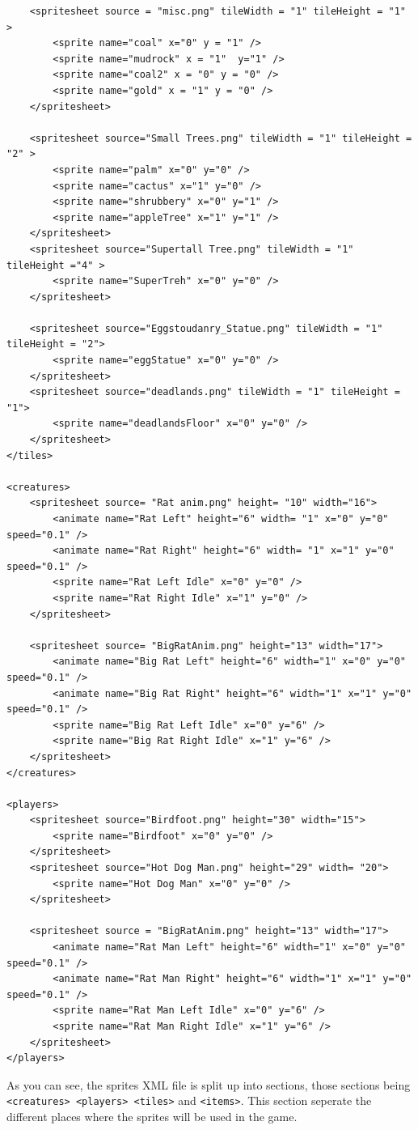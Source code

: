 \documentclass{book}
\begin{document}
\begin{verbatim}
	<spritesheet source = "misc.png" tileWidth = "1" tileHeight = "1" >
		<sprite name="coal" x="0" y = "1" />
		<sprite name="mudrock" x = "1"  y="1" />
		<sprite name="coal2" x = "0" y = "0" />
		<sprite name="gold" x = "1" y = "0" />
	</spritesheet>

	<spritesheet source="Small Trees.png" tileWidth = "1" tileHeight = "2" >
		<sprite name="palm" x="0" y="0" />
		<sprite name="cactus" x="1" y="0" />
		<sprite name="shrubbery" x="0" y="1" />
		<sprite name="appleTree" x="1" y="1" />
	</spritesheet>
	<spritesheet source="Supertall Tree.png" tileWidth = "1" tileHeight ="4" >
		<sprite name="SuperTreh" x="0" y="0" />
	</spritesheet>

	<spritesheet source="Eggstoudanry_Statue.png" tileWidth = "1" tileHeight = "2">
		<sprite name="eggStatue" x="0" y="0" />
	</spritesheet>
	<spritesheet source="deadlands.png" tileWidth = "1" tileHeight = "1">
		<sprite name="deadlandsFloor" x="0" y="0" />
	</spritesheet>
</tiles>

<creatures>
	<spritesheet source= "Rat anim.png" height= "10" width="16">
		<animate name="Rat Left" height="6" width= "1" x="0" y="0" speed="0.1" />
		<animate name="Rat Right" height="6" width= "1" x="1" y="0" speed="0.1" />
		<sprite name="Rat Left Idle" x="0" y="0" />
		<sprite name="Rat Right Idle" x="1" y="0" />
	</spritesheet>

	<spritesheet source= "BigRatAnim.png" height="13" width="17">
		<animate name="Big Rat Left" height="6" width="1" x="0" y="0" speed="0.1" />
		<animate name="Big Rat Right" height="6" width="1" x="1" y="0" speed="0.1" />
		<sprite name="Big Rat Left Idle" x="0" y="6" />
		<sprite name="Big Rat Right Idle" x="1" y="6" />
	</spritesheet>
</creatures>

<players>
	<spritesheet source="Birdfoot.png" height="30" width="15">
		<sprite name="Birdfoot" x="0" y="0" />
	</spritesheet>
	<spritesheet source="Hot Dog Man.png" height="29" width= "20">
		<sprite name="Hot Dog Man" x="0" y="0" />
	</spritesheet>

	<spritesheet source = "BigRatAnim.png" height="13" width="17">
		<animate name="Rat Man Left" height="6" width="1" x="0" y="0" speed="0.1" />
		<animate name="Rat Man Right" height="6" width="1" x="1" y="0" speed="0.1" />
		<sprite name="Rat Man Left Idle" x="0" y="6" />
		<sprite name="Rat Man Right Idle" x="1" y="6" />
	</spritesheet>
</players>
\end{verbatim}
	As you can see, the sprites XML file is split up into sections, those sections being \texttt{<creatures> <players> <tiles>} and \texttt{<items>}. This section seperate the different places where the sprites will be used in the game.
\end{document}
